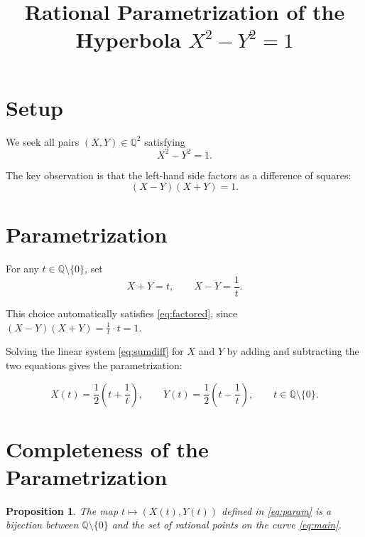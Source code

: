 \documentclass[11pt]{article}
\title{Rational Parametrization of the Hyperbola $X^2 - Y^2 = 1$}
\author{}
\date{}
\newtheorem{proposition}{Proposition}
\begin{document}
\maketitle

\section{Setup}

We seek all pairs $(X,Y) \in \mathbb{Q}^2$ satisfying
\begin{equation}
X^2 - Y^2 = 1.
\label{eq:main}
\end{equation}

The key observation is that the left-hand side factors as a difference of squares:
\begin{equation}
(X - Y)(X + Y) = 1.
\label{eq:factored}
\end{equation}

\section{Parametrization}

For any $t \in \mathbb{Q} \setminus \{0\}$, set
\begin{equation}
X + Y = t, \qquad X - Y = \frac{1}{t}.
\label{eq:sumdiff}
\end{equation}

This choice automatically satisfies \eqref{eq:factored}, since $(X-Y)(X+Y) = \frac{1}{t} \cdot t = 1$.

Solving the linear system \eqref{eq:sumdiff} for $X$ and $Y$ by adding and subtracting the two equations gives the parametrization:

\begin{equation}
\boxed{\,X(t) = \frac{1}{2}\left(t + \frac{1}{t}\right), \qquad Y(t) = \frac{1}{2}\left(t - \frac{1}{t}\right), \qquad t \in \mathbb{Q}\setminus\{0\}.\,}
\label{eq:param}
\end{equation}

\section{Completeness of the Parametrization}

\begin{proposition}
The map $t \mapsto (X(t), Y(t))$ defined in \eqref{eq:param} is a bijection between $\mathbb{Q}\setminus\{0\}$ and the set of rational points on the curve \eqref{eq:main}.
\end{proposition}
\end{document}

